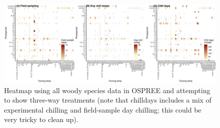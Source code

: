 \documentclass[11pt,letter]{article}
\begin{document}
\begin{figure}[t!]
\centering
\includegraphics[width=1\textwidth]{..//..//analyses/limitingcues/figures/heatallosp_3treats.pdf}
\caption{Heatmap using all woody species data in OSPREE and attempting to show three-way treatments (note that chilldays includes a mix of experimental chilling and field-sample day chilling; this could be very tricky to clean up).}
  \label{fig:heatmap3p}
\end{figure}
\end{document}
